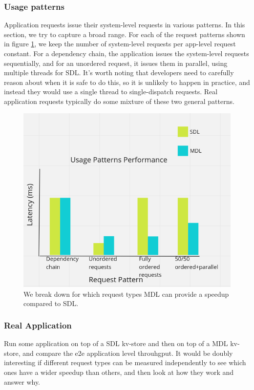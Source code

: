 \subsubsection{Usage patterns}
Application requests issue their system-level requests in various patterns. In this section, we try to capture a broad range.
For each of the request patterns shown in figure \ref{fig:usage}, we keep the number of system-level requests per app-level request constant. For a dependency chain, the application issues the system-level requests sequentially, and for an unordered request, it issues them in parallel, using multiple threads for SDL. It's worth noting that developers need to carefully reason about when it is safe to do this, so it is unlikely to happen in practice, and instead they would use a single thread to single-dispatch requests. Real application requests typically do some mixture of these two general patterns.
\begin{figure}[!htb]
\includegraphics[scale=.32]{usage_patterns_perf.png}
\caption{We break down for which request types MDL can provide a speedup compared to SDL.}
\label{fig:usage}
\end{figure}
\subsubsection{Real Application}
Run some application on top of a SDL kv-store and then on top of a MDL kv-store, and compare the e2e application level throuhgput. It would be doubly interesting if different request types can be measured independently to see which ones have a wider speedup than others, and then look at how they work and answer why.

